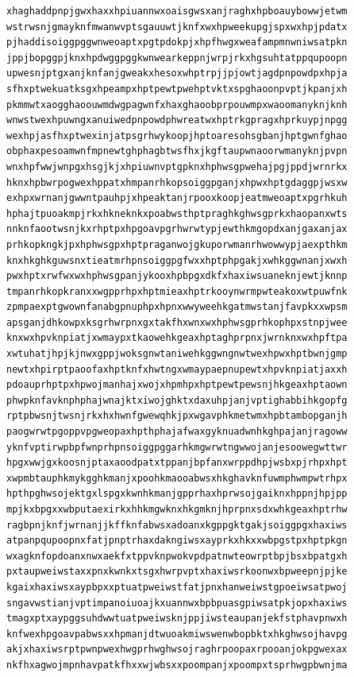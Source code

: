 \documentclass[11pt,letterpaper]{exam}
\begin{document}
\begin{questions}
\begin{verbatim}
xhaghaddpnpjgwxhaxxhpiuannwxoaisgwsxanjraghxhpboauybowwjetwm
wstrwsnjgmayknfmwanwvptsgauuwtjknfxwxhpweekupgjspxwxhpjpdatx
pjhaddisoiggpggwnweoaptxpgtpdokpjxhpfhwgxweafampmnwniwsatpkn
jppjbopggpjknxhpdwggpggkwnwearkeppnjwrpjrkxhgsuhtatppqupoopn
upwesnjptgxanjknfanjgweakxhesoxwhptrpjjpjowtjagdpnpowdpxhpja
sfhxptwekuatksgxhpeampxhptpewtpwehptvktxspghaoonpvptjkpanjxh
pkmmwtxaogghaoouwmdwgpagwnfxhaxghaoobprpouwmpxwaoomanyknjknh
wnwstwexhpuwngxanuiwedpnpowdphwreatwxhptrkgpragxhprkuypjnpgg
wexhpjasfhxptwexinjatpsgrhwykoopjhptoaresohsgbanjhptgwnfghao
obphaxpesoamwnfmpnewtghphagbtwsfhxjkgftaupwnaoorwmanyknjpvpn
wnxhpfwwjwnpgxhsgjkjxhpiuwnvptgpknxhphwsgpwehajpgjppdjwrnrkx
hknxhpbwrpogwexhppatxhmpanrhkopsoiggpganjxhpwxhptgdaggpjwsxw
exhpxwrnanjgwwntpauhpjxhpeaktanjrpooxkoopjeatmweoaptxpgrhkuh
hphajtpuoakmpjrkxhkneknkxpoabwsthptpraghkghwsgprkxhaopanxwts
nnknfaootwsnjkxrhptpxhpgoavpgrhwrwtypjewthkmgopdxanjgaxanjax
prhkopkngkjpxhphwsgpxhptpraganwojgkuporwmanrhwowwypjaexpthkm
knxhkghkguwsnxtieatmrhpnsoiggpgfwxxhptphpgakjxwhkggwnanjxwxh
pwxhptxrwfwxwxhphwsgpanjykooxhpbpgxdkfxhaxiwsuaneknjewtjknnp
tmpanrhkopkranxxwgpprhpxhptmieaxhptrkooynwrmpwteakoxwtpuwfnk
zpmpaexptgwownfanabgpnuphpxhpnxwwyweehkgatmwstanjfavpkxxwpsm
apsganjdhkowpxksgrhwrpnxgxtakfhxwnxwxhphwsgprhkophpxstnpjwee
knxwxhpvknpiatjxwmaypxtkaowehkgeaxhptaghprpnxjwrnknxwxhpftpa
xwtuhatjhpjkjnwxgppjwoksgnwtaniwehkggwngnwtwexhpwxhptbwnjgmp
newtxhpirptpaoofaxhptknfxhwtngxwmaypaepnupewtxhpvknpiatjaxxh
pdoauprhptpxhpwojmanhajxwojxhpmhpxhptpewtpewsnjhkgeaxhptaown
phwpknfavknphphajwnajktxiwojghktxdaxuhpjanjvptighabbihkgopfg
rptpbwsnjtwsnjrkxhxhwnfgwewqhkjpxwgavphkmetwmxhpbtambopganjh
paogwrwtpgoppvpgweopaxhpthphajafwaxgyknuadwnhkghpajanjragoww
yknfvptirwpbpfwnprhpnsoiggpggarhkmgwrwtngwwojanjesoowegwttwr
hpgxwwjgxkoosnjptaxaoodpatxtppanjbpfanxwrppdhpjwsbxpjrhpxhpt
xwpmbtauphkmykgghkmanjxpoohkmaooabwsxhkghavknfuwmphwmpwtrhpx
hpthpghwsojektgxlspgxkwnhkmanjgpprhaxhprwsojgaiknxhppnjhpjpp
mpjkxbpgxxwbputaexirkxhhkmgwknxhkgmknjhprpnxsdxwhkgeaxhptrhw
ragbpnjknfjwrnanjjkffknfabwsxadoanxkgppgktgakjsoiggpgxhaxiws
atpanpqupoopnxfatjpnptrhaxdakngiwsxayprkxhkxxwbpgstpxhptpkgn
wxagknfopdoanxnwxaekfxtppvknpwokvpdpatnwteowrptbpjbsxbpatgxh
pxtaupweiwstaxxpnxkwnkxtsgxhwrpvptxhaxiwsrkoonwxbpweepnjpjke
kgaixhaxiwsxaypbpxxptuatpweiwstfatjpnxhanweiwstgpoeiwsatpwoj
sngavwstianjvptimpanoiuoajkxuannwxbpbpuasgpiwsatpkjopxhaxiws
tmagxptxaypggsuhdwwtuatpweiwsknjppjiwsteaupanjekfstphavpnwxh
knfwexhpgoavpabwsxxhpmanjdtwuoakmiwswenwbopbktxhkghwsojhavpg
akjxhaxiwsrptpwnpwexhwgprhwghwsojraghrpoopaxrpooanjokpgwexax
nkfhxagwojmpnhavpatkfhxxwjwbsxxpoompanjxpoompxtsprhwgpbwnjma

\end{verbatim}
\end{questions}
\end{document}
